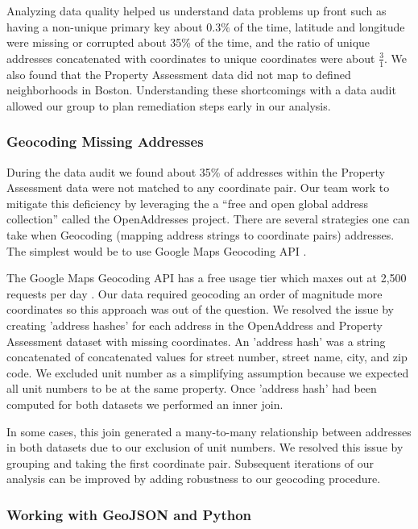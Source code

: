 \documentclass[12pt]{article}
\begin{document}
Analyzing data quality helped us understand data problems up front
such as having a non-unique primary key about $0.3\%$ of the time,
latitude and longitude were missing or corrupted about 35\% of the time,
and the ratio of unique addresses concatenated with coordinates to
unique coordinates were about $\frac{3}{1}$. We also found that the
Property Assessment data did not map to defined neighborhoods in Boston.
Understanding these shortcomings with a data audit allowed our group
to plan remediation steps early in our analysis.


\subsubsection{Geocoding Missing Addresses}

During the data audit we found about 35\% of addresses within the
Property Assessment data were not matched to any coordinate pair. Our
team work to mitigate this deficiency by leveraging the
a ``free and open global address collection'' called the
OpenAddresses \cite{OpenAddr24:online} project. There are several
strategies one can take when Geocoding (mapping address strings to
coordinate pairs) addresses. The simplest would be to use Google Maps
Geocoding API \cite{GettingS89:online}.

The Google Maps Geocoding API has a free usage tier which maxes out at
2,500 requests per day \cite{GettingS89:online}. Our data required
geocoding an order of magnitude more coordinates so this approach was
out of the question. We resolved the issue by creating 'address hashes'
for each address in the OpenAddress and Property Assessment dataset
with missing coordinates. An 'address hash' was a string concatenated
of concatenated values for street number, street name, city, and zip
code. We excluded unit number as a simplifying assumption because we
expected all unit numbers to be at the same property. Once 'address
hash' had been computed for both datasets we performed an inner join.

In some cases, this join generated a many-to-many relationship between
addresses in both datasets due to our exclusion of unit numbers. We
resolved this issue by grouping and taking the first coordinate pair.
Subsequent iterations of our analysis can be improved by adding
robustness to our geocoding procedure.

\subsubsection{Working with GeoJSON and Python}
\end{document}
